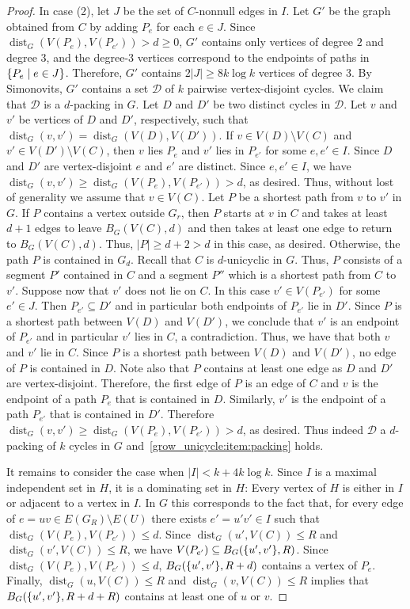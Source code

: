 \documentclass{patmorin}
\DeclareMathOperator{\dist}{dist}
\DeclarePairedDelimiter\set{\{}{\}}
\begin{document}
\begin{proof}
  In case (2), let $J$ be the set of $C$-nonnull edges in $I$.
  Let $G'$ be the graph obtained from $C$ by adding $P_e$ for each $e\in J$.
  Since $\dist_G(V(P_e),V(P_{e'}))>d\ge0$, $G'$ contains only vertices of degree $2$ and degree $3$, and the degree-$3$ vertices correspond to the endpoints of paths in $\set{P_e \mid e\in J}$.
  Therefore, $G'$ contains $2|J|\geq 8k\log k$ vertices of degree $3$.
  By Simonovits, $G'$ contains a set $\mathcal{D}$ of $k$ pairwise vertex-disjoint cycles.
  We claim that $\mathcal{D}$ is a $d$-packing in $G$.
  Let $D$ and $D'$ be two distinct cycles in $\mathcal{D}$.
  Let $v$ and $v'$ be vertices of $D$ and $D'$, respectively,
  such that $\dist_G(v,v')=\dist_G(V(D),V(D'))$.
  If $v\in V(D)\setminus V(C)$ and $v'\in V(D')\setminus V(C)$, then
  $v$ lies $P_e$ and $v'$ lies in $P_{e'}$ for some  $e,e' \in I$.
  Since $D$ and $D'$ are vertex-disjoint $e$ and $e'$ are distinct.
  Since $e,e'\in I$, we have $\dist_G(v,v') \geq \dist_G(V(P_e),V(P_{e'}))>d$, as desired.
  Thus, without lost of generality we assume that $v \in V(C)$.
  Let $P$ be a shortest path from $v$ to $v'$ in $G$.
  If $P$ contains a vertex outside $G_r$, then
  $P$ starts at $v$ in $C$ and takes at least $d+1$ edges to leave $B_G(V(C),d)$ and then takes at least one edge to return to $B_G(V(C),d)$.
  Thus, $|P|\geq d+2 > d$ in this case, as desired.
  Otherwise, the path $P$ is contained in $G_d$.
  Recall that $C$ is $d$-unicyclic in $G$.
  Thus, $P$ consists of a segment $P'$ contained in $C$ and a segment $P''$ which is a shortest path from $C$ to $v'$.
  Suppose now that $v'$ does not lie on $C$.
  In this case $v' \in V(P_{e'})$ for some $e'\in J$.
  Then $P_{e'}\subseteq D'$ and in particular both endpoints of $P_{e'}$ lie in $D'$.
  Since $P$ is a shortest path between $V(D)$ and $V(D')$,
  we conclude that $v'$ is an endpoint of $P_{e'}$ and in particular $v'$ lies in $C$, a contradiction.
  Thus, we have that both $v$ and $v'$ lie in $C$.
  Since $P$ is a shortest path between $V(D)$ and $V(D')$, no edge of $P$ is contained in $D$. Note also that $P$ contains at least one edge as $D$ and $D'$ are vertex-disjoint. Therefore, the first edge of $P$ is an edge of $C$ and $v$ is the endpoint of a path $P_e$ that is contained in $D$. Similarly, $v'$ is the endpoint of a path $P_{e'}$ that is contained in $D'$. Therefore $\dist_G(v,v')\ge \dist_G(V(P_e),V(P_{e'}))>d$, as desired.
  Thus indeed $\mathcal{D}$ a $d$-packing of  $k$ cycles in $G$ and~\eqref{grow_unicycle:item:packing} holds.

  It remains to consider the case when $|I| < k+4k\log k$.
  Since $I$ is a maximal independent set in $H$, it is a dominating set in $H$: Every vertex of $H$ is either in $I$ or adjacent to a vertex in $I$.  In $G$ this corresponds to the fact that, for every edge of $e=uv\in E(G_R)\setminus E(U)$ there exists $e'=u'v'\in I$ such that $\dist_G(V(P_{e}),V(P_{e'}))\le d$.
  Since $\dist_G(u',V(C))\leq R$ and $\dist_G(v',V(C))\leq R$,
  we have $V(P_{e'}) \subseteq B_G(\set{u',v'},R)$. Since $\dist_G(V(P_e),V(P_{e'}))\le d$,  $B_G(\set{u',v'},R+d)$ contains a vertex of $P_e$.
  Finally, $\dist_G(u,V(C))\leq R$ and $\dist_G(v,V(C))\leq R$ implies that
  $B_{G}(\set{u',v'},R+d+R)$ contains at least one of $u$ or $v$.


\end{proof}
\end{document}
